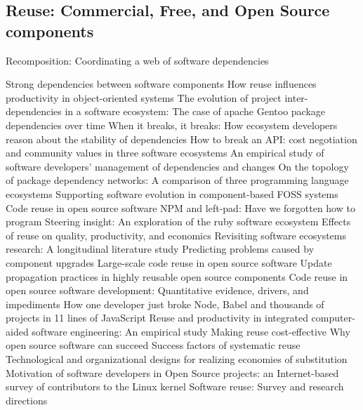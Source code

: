 \subsection{Reuse: Commercial, Free, and Open Source components}

\citep{Grinter2003} Recomposition: Coordinating a web of software dependencies

\citep{Abate2009} Strong dependencies between software components
\citep{Basili1996} How reuse influences productivity in object-oriented systems
\citep{Bavota2013} The evolution of project inter-dependencies in a software ecosystem: The case of apache
\citep{Bloemen2014} Gentoo package dependencies over time
\citep{Bogart2015} When it breaks, it breaks: How ecosystem developers reason about the stability of dependencies
\citep{Bogart2016} How to break an API: cost negotiation and community values in three software ecosystems
\citep{DeSouza2008} An empirical study of software developers' management of dependencies and changes
\citep{Decan2016} On the topology of package dependency networks: A comparison of three programming language ecosystems
\citep{DiCosmo2011} Supporting software evolution in component-based FOSS systems
\citep{Haefliger2008} Code reuse in open source software
\citep{Haney2016} NPM and left-pad: Have we forgotten how to program
\citep{Kabbedijk2011} Steering insight: An exploration of the ruby software ecosystem
\citep{Lim1994} Effects of reuse on quality, productivity, and economics
\citep{Manikas2016} Revisiting software ecosystems research: A longitudinal literature study
\citep{McCamant2003} Predicting problems caused by component upgrades
\citep{Mockus2007} Large-scale code reuse in open source software
\citep{Orsila2008} Update propagation practices in highly reusable open source components
\citep{Sojer2010} Code reuse in open source software development: Quantitative evidence, drivers, and impediments
\citep{Williams2016} How one developer just broke Node, Babel and thousands of projects in 11 lines of JavaScript
\citep{Banker1991} Reuse and productivity in integrated computer-aided software engineering: An empirical study
\citep{Barns1991} Making reuse cost-effective
\citep{Bonaccorsi2003} Why open source software can succeed
\citep{Frakes1994} Success factors of systematic reuse
\citep{Garud1995} Technological and organizational designs for realizing economies of substitution
\citep{Hertel2003} Motivation of software developers in Open Source projects: an Internet-based survey of contributors to the Linux kernel
\citep{Kim1998} Software reuse: Survey and research directions
